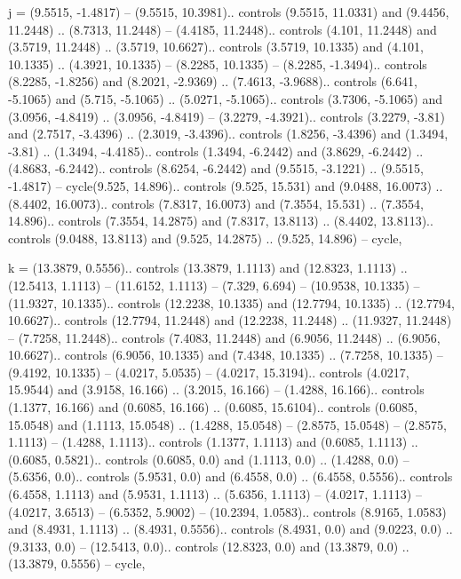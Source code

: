 j = {(9.5515, -1.4817) -- (9.5515, 10.3981).. controls (9.5515, 11.0331) and (9.4456, 11.2448) .. (8.7313, 11.2448) -- (4.4185, 11.2448).. controls (4.101, 11.2448) and (3.5719, 11.2448) .. (3.5719, 10.6627).. controls (3.5719, 10.1335) and (4.101, 10.1335) .. (4.3921, 10.1335) -- (8.2285, 10.1335) -- (8.2285, -1.3494).. controls (8.2285, -1.8256) and (8.2021, -2.9369) .. (7.4613, -3.9688).. controls (6.641, -5.1065) and (5.715, -5.1065) .. (5.0271, -5.1065).. controls (3.7306, -5.1065) and (3.0956, -4.8419) .. (3.0956, -4.8419) -- (3.2279, -4.3921).. controls (3.2279, -3.81) and (2.7517, -3.4396) .. (2.3019, -3.4396).. controls (1.8256, -3.4396) and (1.3494, -3.81) .. (1.3494, -4.4185).. controls (1.3494, -6.2442) and (3.8629, -6.2442) .. (4.8683, -6.2442).. controls (8.6254, -6.2442) and (9.5515, -3.1221) .. (9.5515, -1.4817) -- cycle(9.525, 14.896).. controls (9.525, 15.531) and (9.0488, 16.0073) .. (8.4402, 16.0073).. controls (7.8317, 16.0073) and (7.3554, 15.531) .. (7.3554, 14.896).. controls (7.3554, 14.2875) and (7.8317, 13.8113) .. (8.4402, 13.8113).. controls (9.0488, 13.8113) and (9.525, 14.2875) .. (9.525, 14.896) -- cycle},

k = {(13.3879, 0.5556).. controls (13.3879, 1.1113) and (12.8323, 1.1113) .. (12.5413, 1.1113) -- (11.6152, 1.1113) -- (7.329, 6.694) -- (10.9538, 10.1335) -- (11.9327, 10.1335).. controls (12.2238, 10.1335) and (12.7794, 10.1335) .. (12.7794, 10.6627).. controls (12.7794, 11.2448) and (12.2238, 11.2448) .. (11.9327, 11.2448) -- (7.7258, 11.2448).. controls (7.4083, 11.2448) and (6.9056, 11.2448) .. (6.9056, 10.6627).. controls (6.9056, 10.1335) and (7.4348, 10.1335) .. (7.7258, 10.1335) -- (9.4192, 10.1335) -- (4.0217, 5.0535) -- (4.0217, 15.3194).. controls (4.0217, 15.9544) and (3.9158, 16.166) .. (3.2015, 16.166) -- (1.4288, 16.166).. controls (1.1377, 16.166) and (0.6085, 16.166) .. (0.6085, 15.6104).. controls (0.6085, 15.0548) and (1.1113, 15.0548) .. (1.4288, 15.0548) -- (2.8575, 15.0548) -- (2.8575, 1.1113) -- (1.4288, 1.1113).. controls (1.1377, 1.1113) and (0.6085, 1.1113) .. (0.6085, 0.5821).. controls (0.6085, 0.0) and (1.1113, 0.0) .. (1.4288, 0.0) -- (5.6356, 0.0).. controls (5.9531, 0.0) and (6.4558, 0.0) .. (6.4558, 0.5556).. controls (6.4558, 1.1113) and (5.9531, 1.1113) .. (5.6356, 1.1113) -- (4.0217, 1.1113) -- (4.0217, 3.6513) -- (6.5352, 5.9002) -- (10.2394, 1.0583).. controls (8.9165, 1.0583) and (8.4931, 1.1113) .. (8.4931, 0.5556).. controls (8.4931, 0.0) and (9.0223, 0.0) .. (9.3133, 0.0) -- (12.5413, 0.0).. controls (12.8323, 0.0) and (13.3879, 0.0) .. (13.3879, 0.5556) -- cycle},

